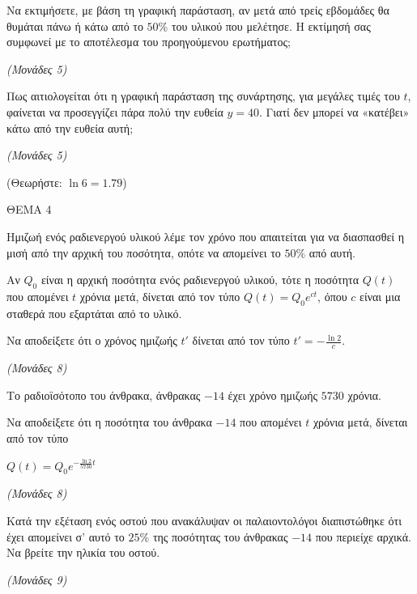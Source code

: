 \documentclass[11pt,a4paper,twoside]{book}
\newcommand{\monades}[1]{\hfill \textit{(Μονάδες #1)}}
\begin{document}
\begin{alist}
\item Να εκτιμήσετε, με βάση τη γραφική παράσταση, αν μετά από τρείς εβδομάδες θα θυμάται πάνω ή κάτω από το $50\%$ του υλικού που μελέτησε. Η εκτίμησή σας συμφωνεί με το αποτέλεσμα του προηγούμενου ερωτήματος;

\monades{5}

\item Πως αιτιολογείται ότι η γραφική παράσταση της συνάρτησης, για μεγάλες τιμές του $t$, φαίνεται να προσεγγίζει πάρα πολύ την ευθεία $y = 40$. Γιατί δεν μπορεί να «κατέβει» κάτω από την ευθεία αυτή;

\monades{5}

(Θεωρήστε: $\ln 6 = 1.79$)
\end{alist}

\vspace{4mm}

ΘΕΜΑ 4

Ημιζωή ενός ραδιενεργού υλικού λέμε τον χρόνο που απαιτείται για να διασπασθεί η μισή από την αρχική του ποσότητα, οπότε να απομείνει το $50\%$ από αυτή.

Αν $Q_0$ είναι η αρχική ποσότητα ενός ραδιενεργού υλικού, τότε η ποσότητα $Q(t)$ που απομένει $t$ χρόνια μετά, δίνεται από τον τύπο $Q(t) = Q_0 e^{ct}$, όπου $c$ είναι μια σταθερά που εξαρτάται από το υλικό.

\begin{alist}
\item Να αποδείξετε ότι ο χρόνος ημιζωής $t'$ δίνεται από τον τύπο $t' = -\frac{\ln 2}{c}$.

\monades{8}

Το ραδιοϊσότοπο του άνθρακα, άνθρακας $-14$ έχει χρόνο ημιζωής $5730$ χρόνια.

\item Να αποδείξετε ότι η ποσότητα του άνθρακα $-14$ που απομένει $t$ χρόνια μετά, δίνεται από τον τύπο

$Q(t) = Q_0 e^{-\frac{\ln 2}{5730} t}$

\monades{8}

\item Κατά την εξέταση ενός οστού που ανακάλυψαν οι παλαιοντολόγοι διαπιστώθηκε ότι έχει απομείνει σ' αυτό το $25\%$ της ποσότητας του άνθρακας $-14$ που περιείχε αρχικά. Να βρείτε την ηλικία του οστού.

\monades{9}
\end{alist}

\vspace{4mm}
\end{document}
